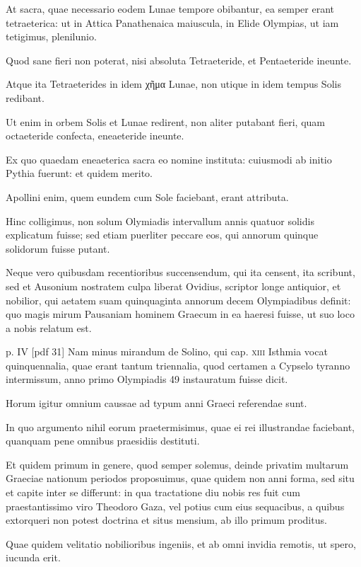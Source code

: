 \begin{parnumbers}
At sacra,
quae necessario eodem Lunae tempore obibantur, ea semper erant
tetraeterica: ut in Attica Panathenaica maiuscula, in Elide Olympias,
ut iam tetigimus, plenilunio.

Quod sane fieri non poterat, nisi absoluta
Tetraeteride, et Pentaeteride ineunte.

Atque ita Tetraeterides
in idem \textgreek{χῆμα} Lunae, non utique in idem tempus Solis redibant.

Ut
enim in orbem Solis et Lunae redirent, non aliter putabant fieri,
quam octaeteride confecta, eneaeteride ineunte.

Ex quo quaedam
eneaeterica sacra eo nomine instituta: cuiusmodi ab initio Pythia
fuerunt: et quidem merito.

Apollini enim, quem eundem cum Sole
faciebant, erant attributa.

Hinc colligimus, non solum Olymiadis
intervallum annis quatuor solidis explicatum fuisse; sed etiam puerliter
peccare eos, qui annorum quinque solidorum fuisse putant.

Neque vero quibusdam recentioribus succensendum, qui ita censent,
ita scribunt, sed et Ausonium nostratem culpa liberat Ovidius, scriptor
longe antiquior, et nobilior, qui aetatem suam quinquaginta annorum
decem Olympiadibus definit: quo magis mirum Pausaniam
hominem Graecum in ea haeresi fuisse, ut suo loco a nobis relatum est.

\clearpage
p. IV [pdf 31]
Nam minus mirandum de Solino, qui cap. \textsc{xiii} Isthmia vocat
quinquennalia, quae erant tantum triennalia, quod certamen a Cypselo
tyranno intermissum, anno primo Olympiadis 49 instauratum
fuisse dicit.

Horum igitur omnium caussae ad typum anni Graeci referendae
sunt.

In quo argumento nihil eorum praetermisimus, quae
ei rei illustrandae faciebant, quanquam pene omnibus praesidiis
destituti.

Et quidem primum in genere, quod semper solemus, deinde
privatim multarum Graeciae nationum periodos proposuimus,
quae quidem non anni forma, sed situ et capite inter se differunt: in
qua tractatione diu nobis res fuit cum praestantissimo viro Theodoro
Gaza, vel potius cum eius sequacibus, a quibus extorqueri non
potest doctrina et situs mensium, ab illo primum proditus. 

Quae quidem
velitatio nobilioribus ingeniis, et ab omni invidia remotis, ut
spero, iucunda erit.


\end{parnumbers}
